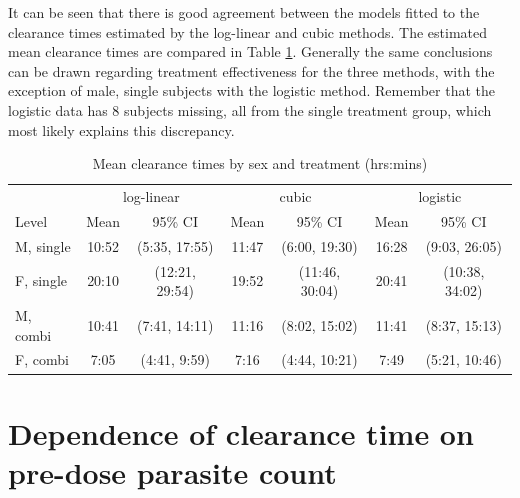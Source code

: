 It can be seen that there is good agreement between the models fitted to the clearance times estimated by the log-linear and cubic methods. The estimated mean clearance times are compared in Table \ref{compinf}. Generally the same conclusions can be drawn regarding treatment effectiveness for the three methods, with the exception of male, single subjects with the logistic method. Remember that the logistic data has 8 subjects missing, all from the single treatment group, which most likely explains this discrepancy.
\begin{table}[h]
\centering
\caption{Mean clearance times by sex and treatment (hrs:mins)}\label{compinf}
\begin{tabular}{|l|cc|cc|cc|}
\hline
&\multicolumn{2}{c|}{log-linear}&\multicolumn{2}{c|}{cubic}&\multicolumn{2}{c|}{logistic}\\
Level		&Mean&95\% CI&Mean&95\% CI&Mean&95\% CI\\
\hline
M, single 		& 10:52 & (5:35, 17:55) &11:47& (6:00, 19:30) & 16:28 &(9:03, 26:05)\\
F, single		& 20:10 & (12:21,  29:54) &19:52&(11:46, 30:04) & 20:41&(10:38, 34:02)\\
M, combi	 	& 10:41 & (7:41, 14:11) &11:16&(8:02, 15:02) & 11:41 &(8:37, 15:13)\\
F, combi	 	& 7:05 & (4:41, 9:59) &7:16&(4:44, 10:21) & 7:49 & (5:21, 10:46)\\
\hline
\end{tabular}
\end{table}

\section{Dependence of clearance time on pre-dose parasite count}
